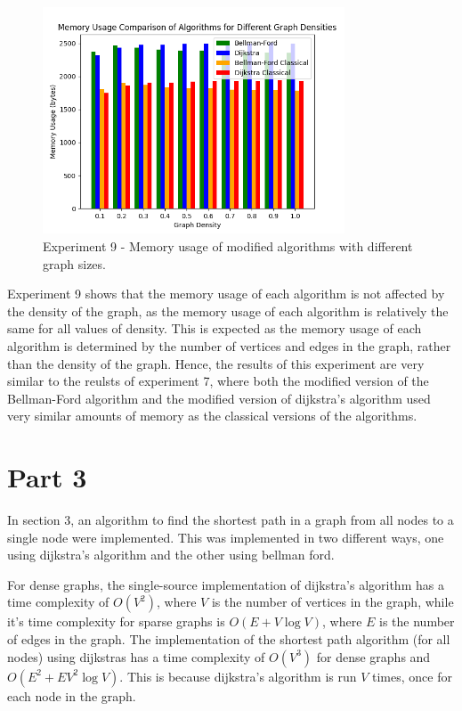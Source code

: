 \documentclass{article}
\begin{document}
\begin{onehalfspace}
\begin{figure}[H] 
    \centering
    \includegraphics[width=0.8\textwidth]{Figures/Memory_densities.png} 
    \caption{\footnotesize Experiment 9 - Memory usage of modified algorithms with different graph sizes.}
    \label{fig:Figure 9} 
\end{figure}

Experiment 9 shows that the memory usage of each algorithm is not affected by the density of the graph, as the memory usage of each algorithm is relatively the same for all values of density.
This is expected as the memory usage of each algorithm is determined by the number of vertices and edges in the graph, rather than the density of the graph.
Hence, the results of this experiment are very similar to the reulsts of experiment 7, where both the modified version of the Bellman-Ford algorithm and the modified version of dijkstra's algorithm used very similar amounts of memory as the classical versions of the algorithms.

\section*{Part 3}
In section 3, an algorithm to find the shortest path in a graph from all nodes to a single node were implemented. 
This was implemented in two different ways, one using dijkstra's algorithm and the other using bellman ford.

\smallskip
For dense graphs, the single-source implementation of dijkstra's algorithm has a time complexity of $O(V^2)$,
where $V$ is the number of vertices in the graph, while it's time complexity for sparse graphs is $O(E + V \log V)$, where $E$ is the number of edges in the graph.
The implementation of the shortest path algorithm (for all nodes) using dijkstras has a time complexity of 
$O(V^3)$ for dense graphs and $O(E^2 + EV^2 \log V)$. This is because dijkstra's algorithm is run $V$ times, once for each node in the graph.


\end{onehalfspace}
\end{document}
